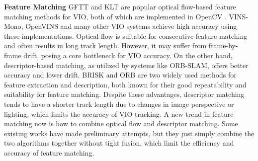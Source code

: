 \textbf{Feature Matching}
    GFTT\cite{gftt1994shi} and KLT\cite{Lucas_Kanade_1981_KLT} are popular optical flow-based feature matching methods for VIO, both of which are implemented in OpenCV \cite{opencv_library}. VINS-Mono\cite{qin-tro-2018_VINS-Mono}, OpenVINS\cite{geneva2020openvins} and many other VIO systems achieve high accuracy using these implementations.  Optical flow is suitable for consecutive feature matching and often results in long track length. However, it may suffer from frame-by-frame drift, posing a core bottleneck for VIO accuracy.  On the other hand, descriptor-based matching, as utilized by systems like ORB-SLAM\cite{leutenegger-ijrr-2015-OKVIS,campos2021orb-slam3,murartal-ral-2017-VI-ORB}, offers better accuracy and lower drift. BRISK\cite{BRISK} and ORB\cite{rublee2011orb} are two widely used methods for feature extraction and description, both known for their good repeatability and suitability for feature matching. Despite these advantages, descriptor matching tends to have a shorter track length due to changes in image perspective or lighting, which limits the accuracy of VIO tracking.
    A new trend in feature matching now is how to combine optical flow and descriptor matching. Some existing works\cite{bang2017camera,zong2017improved,zhong2023improved} have made preliminary attempts, but they just simply combine the two algorithms together without tight fusion, which limit the efficiency and accuracy of feature matching.